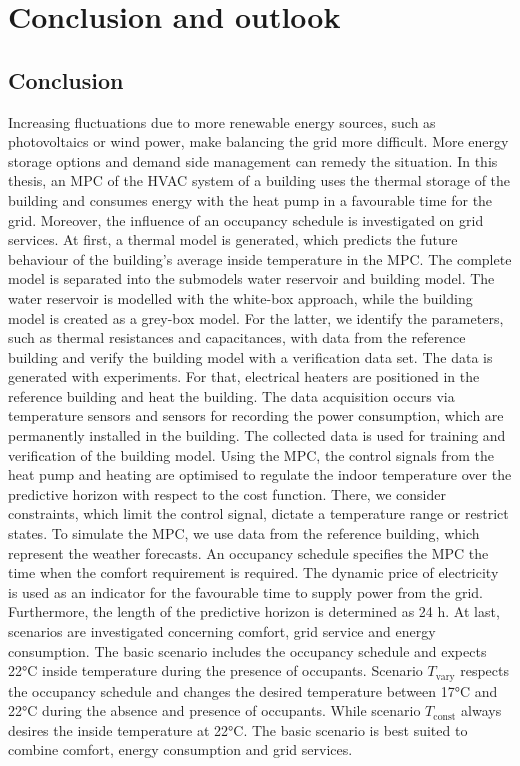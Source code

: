\chapter{Conclusion and outlook}
\label{ch:Conclusionandoutlook}

\section{Conclusion}
\label{sec:conclusion}
Increasing fluctuations due to more renewable energy sources, such as photovoltaics or wind power, make balancing the grid more difficult. More energy storage options and demand side management can remedy the situation. In this thesis, an MPC of the HVAC system of a building uses the thermal storage of the building and consumes energy with the heat pump in a favourable time for the grid. Moreover, the influence of an occupancy schedule is investigated on grid services.\newline
At first, a thermal model is generated, which predicts the future behaviour of the building's average inside temperature in the MPC. The complete model is separated into the submodels water reservoir and building model. The water reservoir is modelled with the white-box approach, while the building model is created as a grey-box model. For the latter, we identify the parameters, such as thermal resistances and capacitances, with data from the reference building and verify the building model with a verification data set. The data is generated with experiments. For that, electrical heaters are positioned in the reference building and heat the building. The data acquisition occurs via temperature sensors and sensors for recording the power consumption, which are permanently installed in the building. The collected data is used for training and verification of the building model. \newline
Using the MPC, the control signals from the heat pump and heating are optimised to regulate the indoor temperature over the predictive horizon with respect to the cost function. There, we consider constraints, which limit the control signal, dictate a temperature range or restrict states. To simulate the MPC, we use data from the reference building, which represent the weather forecasts. An occupancy schedule specifies the MPC the time when the comfort requirement is required. The dynamic price of electricity is used as an indicator for the favourable time to supply power from the grid. Furthermore, the length of the predictive horizon is determined as 24 h.\newline
At last, scenarios are investigated concerning comfort, grid service and energy consumption. The basic scenario includes the occupancy schedule and expects 22°C inside temperature during the presence of occupants. Scenario $T_\text{vary}$ respects the occupancy schedule and changes the desired temperature between 17°C and 22°C during the absence and presence of occupants. While scenario $T_\text{const}$ always desires the inside temperature at 22°C. The basic scenario is best suited to combine comfort, energy consumption and grid services.\newline

